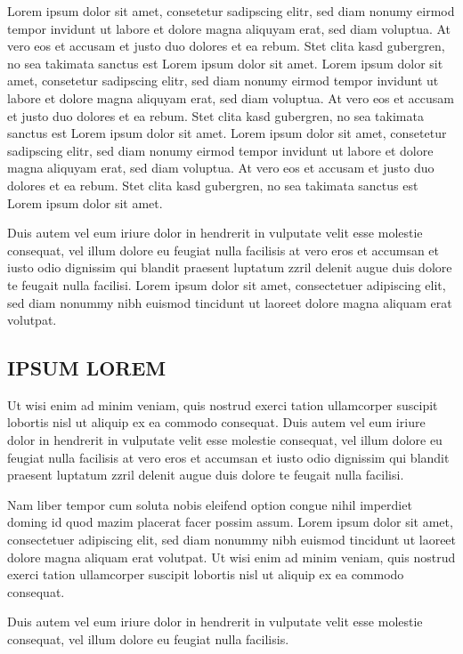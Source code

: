\documentclass[]{../metanetpaper}
\begin{document}
Lorem ipsum dolor sit amet, consetetur sadipscing elitr, sed diam nonumy eirmod tempor invidunt ut labore et dolore magna aliquyam erat, sed diam voluptua. At vero eos et accusam et justo duo dolores et ea rebum. Stet clita kasd gubergren, no sea takimata sanctus est Lorem ipsum dolor sit amet. Lorem ipsum dolor sit amet, consetetur sadipscing elitr, sed diam nonumy eirmod tempor invidunt ut labore et dolore magna aliquyam erat, sed diam voluptua. At vero eos et accusam et justo duo dolores et ea rebum. Stet clita kasd gubergren, no sea takimata sanctus est Lorem ipsum dolor sit amet. Lorem ipsum dolor sit amet, consetetur sadipscing elitr, sed diam nonumy eirmod tempor invidunt ut labore et dolore magna aliquyam erat, sed diam voluptua. At vero eos et accusam et justo duo dolores et ea rebum. Stet clita kasd gubergren, no sea takimata sanctus est Lorem ipsum dolor sit amet.   

Duis autem vel eum iriure dolor in hendrerit in vulputate velit esse molestie consequat, vel illum dolore eu feugiat nulla facilisis at vero eros et accumsan et iusto odio dignissim qui blandit praesent luptatum zzril delenit augue duis dolore te feugait nulla facilisi. Lorem ipsum dolor sit amet, consectetuer adipiscing elit, sed diam nonummy nibh euismod tincidunt ut laoreet dolore magna aliquam erat volutpat.   
\subsection{IPSUM LOREM}
Ut wisi enim ad minim veniam, quis nostrud exerci tation ullamcorper suscipit lobortis nisl ut aliquip ex ea commodo consequat. Duis autem vel eum iriure dolor in hendrerit in vulputate velit esse molestie consequat, vel illum dolore eu feugiat nulla facilisis at vero eros et accumsan et iusto odio dignissim qui blandit praesent luptatum zzril delenit augue duis dolore te feugait nulla facilisi.   

Nam liber tempor cum soluta nobis eleifend option congue nihil imperdiet doming id quod mazim placerat facer possim assum. Lorem ipsum dolor sit amet, consectetuer adipiscing elit, sed diam nonummy nibh euismod tincidunt ut laoreet dolore magna aliquam erat volutpat. Ut wisi enim ad minim veniam, quis nostrud exerci tation ullamcorper suscipit lobortis nisl ut aliquip ex ea commodo consequat.   

Duis autem vel eum iriure dolor in hendrerit in vulputate velit esse molestie consequat, vel illum dolore eu feugiat nulla facilisis.   
\end{document}
